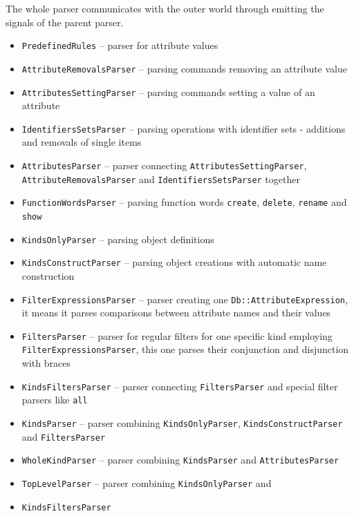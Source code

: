 \documentclass[deska]{subfiles}
\begin{document}
The whole parser communicates with the outer world through emitting the signals of the parent parser.

\begin{itemize}
    \item {\tt PredefinedRules} -- parser for attribute values
    \item {\tt AttributeRemovalsParser} -- parsing commands removing an attribute value
    \item {\tt AttributesSettingParser} -- parsing commands setting a value of an attribute 
    \item {\tt IdentifiersSetsParser} -- parsing operations with identifier sets - additions and removals of single items
    \item {\tt AttributesParser} -- parser connecting {\tt AttributesSettingParser}, {\tt AttributeRemovalsParser} and
                                    {\tt IdentifiersSetsParser} together 
    \item {\tt FunctionWordsParser} -- parsing function words {\tt create}, {\tt delete}, {\tt rename} and {\tt show}
    \item {\tt KindsOnlyParser} -- parsing object definitions
    \item {\tt KindsConstructParser} -- parsing object creations with automatic name construction
    \item {\tt FilterExpressionsParser} -- parser creating one {\tt Db::AttributeExpression}, it means it parses comparisons between
                                           attribute names and their values
    \item {\tt FiltersParser} -- parser for regular filters for one specific kind employing {\tt FilterExpressionsParser}, this one parses
                                 their conjunction and disjunction with braces 
    \item {\tt KindsFiltersParser} -- parser connecting {\tt FiltersParser} and special filter parsers like {\tt all} 
    \item {\tt KindsParser} -- parser combining {\tt KindsOnlyParser}, {\tt KindsConstructParser} and {\tt FiltersParser}
    \item {\tt WholeKindParser} -- parser combining {\tt KindsParser} and {\tt AttributesParser}  
    \item {\tt TopLevelParser} -- parser combining {\tt KindsOnlyParser} and \item {\tt KindsFiltersParser}
\end{itemize}
\end{document}
